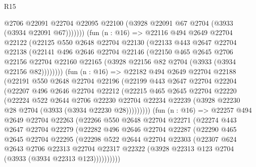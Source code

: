 \begin{lexlean}{R15}
\begin{coremodule}
                @2706
                @22091
                @22704
                @22095
                @22100
                (@3928 @22091 @67 @2704 (@3933 (@3934 @22091 @67)))))))
        (fun (n : @16) =>
        @22116
          @494
          @2649
          @22704
          @22122
          (@22125
            @550
            @2648
            @22704
            @22130
            (@22133
              @443
              @2647
              @22704
              @22138
              (@22141
                @496
                @2646
                @22704
                @22146
                (@22150
                  @465
                  @2645
                  @2706
                  @22156
                  @22704
                  @22160
                  @22165
                  (@3928 @22156 @82 @2704 (@3933 (@3934 @22156 @82))))))))
        (fun (n : @16) =>
        @22182
          @494
          @2649
          @22704
          @22188
          (@22191
            @550
            @2648
            @22704
            @22196
            (@22199
              @443
              @2647
              @22704
              @22204
              (@22207
                @496
                @2646
                @22704
                @22212
                (@22215
                  @465
                  @2645
                  @22704
                  @22220
                  (@22224
                    @522
                    @2644
                    @2706
                    @22230
                    @22704
                    @22234
                    @22239
                    (@3928 @22230 @28 @2704 (@3933 (@3934 @22230 @28)))))))))
        (fun (n : @16) =>
        @22257
          @494
          @2649
          @22704
          @22263
          (@22266
            @550
            @2648
            @22704
            @22271
            (@22274
              @443
              @2647
              @22704
              @22279
              (@22282
                @496
                @2646
                @22704
                @22287
                (@22290
                  @465
                  @2645
                  @22704
                  @22295
                  (@22298
                    @522
                    @2644
                    @22704
                    @22303
                    (@22307
                      @624
                      @2643
                      @2706
                      @22313
                      @22704
                      @22317
                      @22322
                      (@3928 @22313 @123 @2704 (@3933 (@3934 @22313 @123))))))))))

\end{coremodule}
\end{lexlean}

